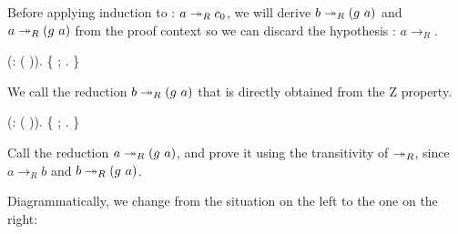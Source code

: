     Before applying induction to : $a \twoheadrightarrow_R c_0$, we will derive 
    $b\tto_R (g\ a)$ and $a\twoheadrightarrow_R (g\ a)$ from the proof context so we can
    discard the hypothesis : $a\to_R. $\begin{coqdoccode}
\coqdocemptyline
\coqdocindent{2.00em}
 (:    ( )).\coqdoceol
\coqdocindent{2.00em}
\{  ; . \} \end{coqdoccode}
We call  the reduction
    $b\tto_R (g\ a)$ that is directly obtained from the Z property. \begin{coqdoccode}
\coqdocnoindent
\coqdoceol
\coqdocindent{2.00em}
 (:    ( )).\coqdoceol
\coqdocindent{2.00em}
\{    ; . \} \end{coqdoccode}
Call  the
        reduction $a\twoheadrightarrow_R (g\ a)$, and prove it using the
        transitivity of $\twoheadrightarrow_R$, since $a \to_R b$ and $b \twoheadrightarrow_R (g\
        a)$.


        Diagrammatically, we change from the situation on the left to
        the one on the right:


